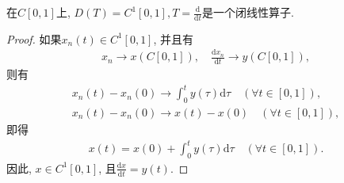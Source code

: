 \documentclass[../../main.tex]{subfiles}%
\begin{document}
\begin{examples}
在$C[0,1]$上, $D(T)=C^1[0,1], T=\frac{\mathrm{d}}{\mathrm{d}t}$是一个闭线性算子.
\end{examples}
\begin{proof}

如果$x_n(t)\in C^1[0,1]$, 并且有
\begin{align*}
x_n\to x(C[0,1]),\quad \frac{\mathrm{d}x_n}{\mathrm{d}t}\to y(C[0,1]),
\end{align*}
则有
\begin{align*}
x_n(t)-x_n(0)\to\int_{0}^{t}y(\tau)\mathrm{d}\tau\quad(\forall t\in[0,1]),\\
x_n(t)-x_n(0)\to x(t)-x(0)\quad(\forall t\in[0,1]),
\end{align*}
即得
\begin{align*}
x(t)=x(0)+\int_{0}^{t}y(\tau)\mathrm{d}\tau\quad(\forall t\in[0,1]).
\end{align*}
因此, $x\in C^1[0,1]$, 且$\frac{\mathrm{d}x}{\mathrm{d}t}=y(t)$.

\end{proof}
\end{document}
